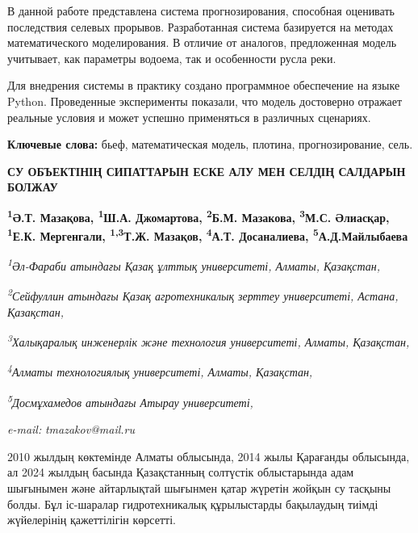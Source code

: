 В данной работе представлена система прогнозирования, способная
оценивать последствия селевых прорывов. Разработанная система базируется
на методах математического моделирования. В отличие от аналогов,
предложенная модель учитывает, как параметры водоема, так и особенности
русла реки.

Для внедрения системы в практику создано программное обеспечение на
языке Python. Проведенные эксперименты показали, что модель достоверно
отражает реальные условия и может успешно применяться в различных
сценариях.

{\bfseries Ключевые слова:} бьеф, математическая модель, плотина,
прогнозирование, сель.

\begin{articleheader}
{\bfseries СУ ОБЪЕКТІНІҢ СИПАТТАРЫН ЕСКЕ АЛУ МЕН СЕЛДІҢ САЛДАРЫН БОЛЖАУ}

{\bfseries
\textsuperscript{1}Ә.Т. Мазақова,
\textsuperscript{1}Ш.А. Джомартова,
\textsuperscript{2}Б.М. Мазакова,
\textsuperscript{3}М.С. Әлиасқар,
\textsuperscript{1}Е.К. Мергенгали,
\textsuperscript{1,3}Т.Ж. Мазақов\textsuperscript{\envelope },
\textsuperscript{4}А.Т. Досаналиева,
\textsuperscript{5}А.Д.Майлыбаева}
\end{articleheader}

\begin{affiliation}
\emph{\textsuperscript{1}Әл-Фараби атындағы Қазақ ұлттық университеті, Алматы, Қазақстан,}

\emph{\textsuperscript{2}Сейфуллин атындағы Қазақ агротехникалық зерттеу университеті, Астана, Қазақстан,}

\emph{\textsuperscript{3}Халықаралық инженерлік және технология университеті, Алматы, Қазақстан,}

\emph{\textsuperscript{4}Алматы технологиялық университеті, Алматы, Қазақстан,}

\emph{\textsuperscript{5}Досмұхамедов атындағы Атырау университеті,}

\emph{e-mail:} \emph{tmazakov@mail.ru}
\end{affiliation}

2010 жылдың көктемінде Алматы облысында, 2014 жылы Қарағанды
\hspace{0pt}\hspace{0pt}облысында, ал 2024 жылдың басында Қазақстанның
солтүстік облыстарында адам шығынымен және айтарлықтай шығынмен қатар
жүретін жойқын су тасқыны болды. Бұл іс-шаралар гидротехникалық
құрылыстарды бақылаудың тиімді жүйелерінің қажеттілігін көрсетті.

